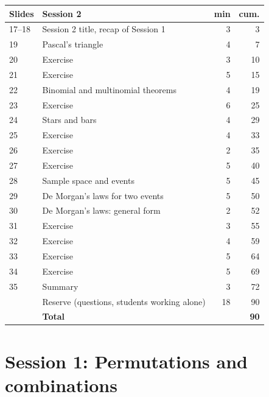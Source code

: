 \documentclass[11pt,a4paper,parskip=half]{scrartcl}
\begin{document}
\begin{center}
	\small
	\begin{tabular}{@{}llrr@{}}
		\toprule
		Slides & Session 2 & min & cum. \\\midrule
		17--18 & Session 2 title, recap of Session 1 & 3 & 3 \\
		19 & Pascal's triangle & 4 & 7 \\
		20 & Exercise~\exref{pascals-rule} & 3 & 10 \\
		21 & Exercise~\exref{binomial-tree} & 5 & 15 \\
		22 & Binomial and multinomial theorems & 4 & 19 \\
		23 & Exercise~\exref{expansions} & 6 & 25 \\
		24 & Stars and bars & 4 & 29 \\
		25 & Exercise~\exref{stars-and-bars} & 4 & 33 \\
		26 & Exercise~\exref{identical-dice} & 2 & 35 \\
		27 & Exercise~\exref{allocating-capital} & 5 & 40 \\
		28 & Sample space and events & 5 & 45 \\
		29 & De Morgan's laws for two events & 5 & 50 \\
		30 & De Morgan's laws: general form & 2 & 52 \\
		31 & Exercise~\exref{sample-space} & 3 & 55 \\
		32 & Exercise~\exref{stock-path-events} & 4 & 59 \\
		33 & Exercise~\exref{credit-basket} & 5 & 64 \\
		34 & Exercise~\exref{bank-products} & 5 & 69 \\
		35 & Summary & 3 & 72 \\
		       & Reserve (questions, students working alone) & 18 & 90 \\\midrule
		       & \textbf{Total} & & \textbf{90} \\\bottomrule
	\end{tabular}
\end{center}

\tableofcontents

\section{Session 1: Permutations and combinations}
\end{document}
